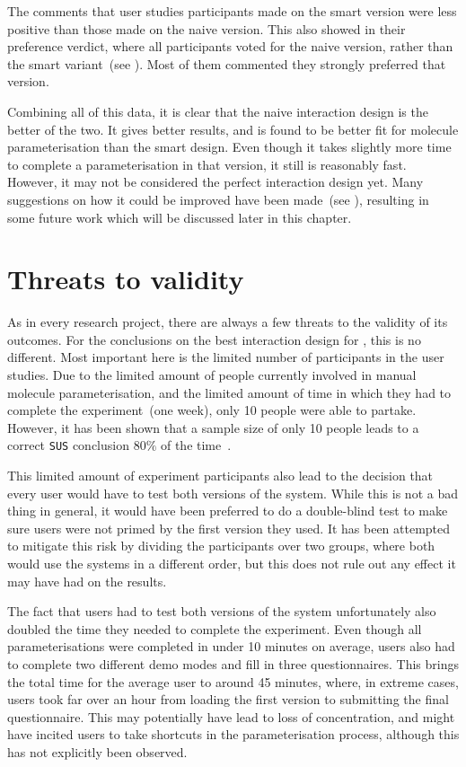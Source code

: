 The comments that user studies participants made on the smart version were less positive than those made on the naive version. This also showed in their preference verdict, where all participants voted for the naive version, rather than the smart variant~(see ). Most of them commented they strongly preferred that version.

Combining all of this data, it is clear that the naive interaction design is the better of the two. It gives better results, and is found to be better fit for molecule parameterisation than the smart design. Even though it takes slightly more time to complete a parameterisation in that version, it still is reasonably fast. However, it may not be considered the perfect interaction design yet. Many suggestions on how it could be improved have been made~(see ), resulting in some future work which will be discussed later in this chapter.


\section{Threats to validity}
As in every research project, there are always a few threats to the validity of its outcomes. For the conclusions on the best interaction design for \oframp, this is no different. Most important here is the limited number of participants in the user studies. Due to the limited amount of people currently involved in manual molecule parameterisation, and the limited amount of time in which they had to complete the experiment~(one week), only 10 people were able to partake. However, it has been shown that a sample size of only 10 people leads to a correct \verb|SUS| conclusion $80\%$ of the time~\cite{tullis2004comparison}.

This limited amount of experiment participants also lead to the decision that every user would have to test both versions of the system. While this is not a bad thing in general, it would have been preferred to do a double-blind test to make sure users were not primed by the first version they used. It has been attempted to mitigate this risk by dividing the participants over two groups, where both would use the systems in a different order, but this does not rule out any effect it may have had on the results.

The fact that users had to test both versions of the system unfortunately also doubled the time they needed to complete the experiment. Even though all parameterisations were completed in under 10 minutes on average, users also had to complete two different demo modes and fill in three questionnaires. This brings the total time for the average user to around 45 minutes, where, in extreme cases, users took far over an hour from loading the first version to submitting the final questionnaire. This may potentially have lead to loss of concentration, and might have incited users to take shortcuts in the parameterisation process, although this has not explicitly been observed.

